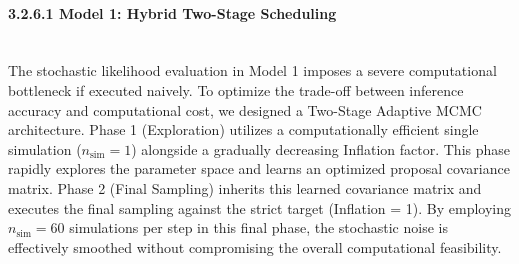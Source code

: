 \paragraph{3.2.6.1 Model 1: Hybrid Two-Stage Scheduling}\mbox{}\\
The stochastic likelihood evaluation in Model 1 imposes a severe computational bottleneck if executed naively.
To optimize the trade-off between inference accuracy and computational cost, we designed a Two-Stage Adaptive MCMC architecture.
Phase 1 (Exploration) utilizes a computationally efficient single simulation ($n_{\text{sim}}=1$) alongside a gradually decreasing Inflation factor.
This phase rapidly explores the parameter space and learns an optimized proposal covariance matrix.
Phase 2 (Final Sampling) inherits this learned covariance matrix and executes the final sampling against the strict target (Inflation = 1).
By employing $n_{\text{sim}}=60$ simulations per step in this final phase, the stochastic noise is effectively smoothed without compromising the overall computational feasibility.

